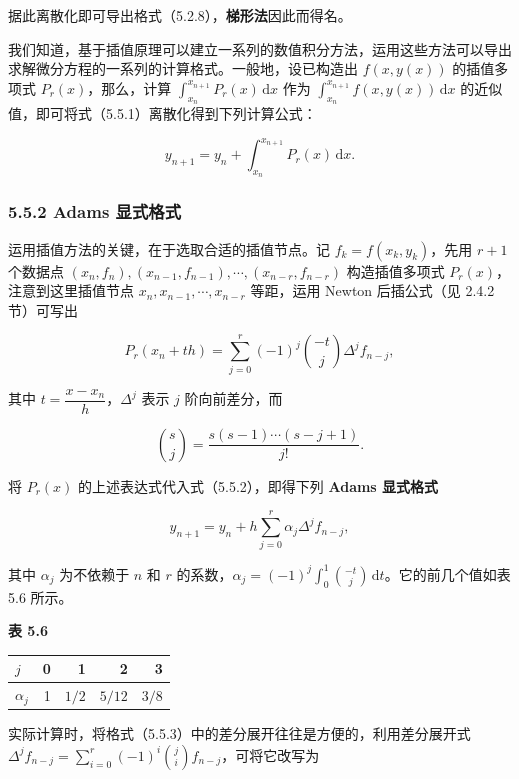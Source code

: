 \documentclass[
  10pt,
  fontset=fandol]{ctexart}
\newcounter{none} %
\begin{document}
据此离散化即可导出格式（5.2.8），\textbf{梯形法}因此而得名。

我们知道，基于插值原理可以建立一系列的数值积分方法，运用这些方法可以导出求解微分方程的一系列的计算格式。一般地，设已构造出 \(f(x,y(x))\) 的插值多项式 \(P_r(x)\)，那么，计算 \(\int_{x_n}^{x_{n+1}}P_r(x)\,\mathrm dx\) 作为 \(\int_{x_n}^{x_{n+1}}f(x,y(x))\,\mathrm dx\) 的近似值，即可将式（5.5.1）离散化得到下列计算公式：

\[
y_{n+1}=y_n+\int_{x_n}^{x_{n+1}}P_r(x)\,\mathrm dx.
\tag{5.5.2}
\]

\subsubsection{5.5.2 Adams 显式格式}\label{adams-ux663eux5f0fux683cux5f0f}

运用插值方法的关键，在于选取合适的插值节点。记 \(f_k=f(x_k,y_k)\)，先用 \(r+1\) 个数据点 \((x_n,\allowbreak f_n),\allowbreak (x_{n-1},\allowbreak f_{n-1}),\allowbreak \cdots,\allowbreak (x_{n-r},\allowbreak f_{n-r})\) 构造插值多项式 \(P_r(x)\)，注意到这里插值节点 \(x_n,x_{n-1},\cdots,x_{n-r}\) 等距，运用 Newton 后插公式（见 2.4.2 节）可写出

\[
P_r(x_n+th)=\sum_{j=0}^r(-1)^j\binom{-t}{j}\Delta^j f_{n-j},
\]

其中 \(t=\dfrac{x-x_n}{h}\)，\(\Delta^j\) 表示 \(j\) 阶向前差分，而

\[
\binom sj=\frac{s(s-1)\cdots(s-j+1)}{j!}.
\]

将 \(P_r(x)\) 的上述表达式代入式（5.5.2），即得下列 \textbf{Adams 显式格式}

\[
y_{n+1}=y_n+h\sum_{j=0}^r\alpha_j\Delta^j f_{n-j},
\tag{5.5.3}
\]

其中 \(\alpha_j\) 为不依赖于 \(n\) 和 \(r\) 的系数，\(\alpha_j=(-1)^j\int_0^1\binom{-t}{j}\,\mathrm dt\)。它的前几个值如表 5.6 所示。

\textbf{表 5.6}

{\def\LTcaptype{none} %
\begin{longtable}[]{@{}lrrrr@{}}
\toprule\noalign{}
\(j\) & 0 & 1 & 2 & 3 \\
\midrule\noalign{}
\endhead
\bottomrule\noalign{}
\endlastfoot
\(\alpha_j\) & 1 & \(1/2\) & \(5/12\) & \(3/8\) \\
\end{longtable}
}

实际计算时，将格式（5.5.3）中的差分展开往往是方便的，利用差分展开式 \(\Delta^j f_{n-j}=\sum_{i=0}^r(-1)^i\binom ji f_{n-j}\)，可将它改写为
\end{document}
